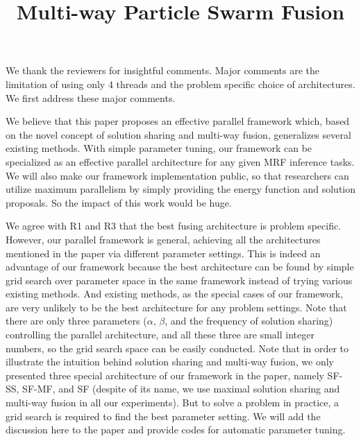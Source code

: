 \documentclass[runningheads]{llncs}
\begin{document}
\pagestyle{headings}
\mainmatter
\def\ECCV16SubNumber{1569}  %

\title{Multi-way Particle Swarm Fusion}

\maketitle
\thispagestyle{empty}


We thank the reviewers for insightful comments. Major comments are
the limitation of using only 4 threads and the problem specific choice of architectures. We first address these major comments.

\vspace{0.15cm}
 We
believe that this paper proposes an effective parallel
framework which, based on the novel concept of solution
sharing and multi-way fusion, generalizes several existing
methods. With simple parameter tuning, our framework can be
specialized as an effective parallel architecture for any
given MRF inference tasks. We will also make our framework implementation public, so that researchers can utilize maximum parallelism by simply providing the energy function and solution proposals. So the
impact of this work would be huge.

\vspace{0.15cm}
 We agree with
R1 and R3 that the best fusing architecture is problem
specific. However, our parallel framework is general,
achieving all the architectures mentioned in the paper via
different parameter settings. This is indeed an advantage of
our framework because the best architecture can be found by
simple grid search over parameter space in the same
framework instead of trying various existing methods. And
existing methods, as the special cases of our framework, are
very unlikely to be the best architecture for any problem
settings. Note that there are only three parameters
($\alpha$, $\beta$, and the frequency of solution sharing)
controlling the parallel architecture, and all these three
are small integer numbers, so the grid search space can be
easily conducted. Note that in order to illustrate the
intuition behind solution sharing and multi-way fusion, we
only presented three special architecture of our framework
in the paper, namely SF-SS, SF-MF, and SF (despite of its
name, we use maximal solution sharing and multi-way fusion
in all our experiments). But to solve a
problem in practice, a grid search is required to find the best
parameter setting. We will add the discussion here to the
paper and provide codes for automatic parameter tuning.
\end{document}
